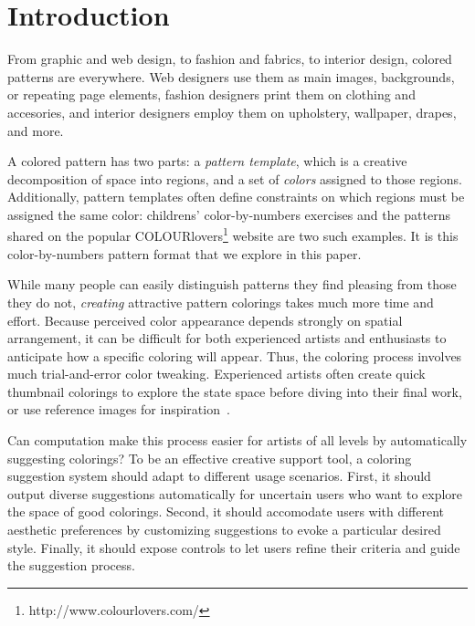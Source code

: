 \section{Introduction}
\label{sec:introduction}

From graphic and web design, to fashion and fabrics, to interior design, colored patterns are everywhere. Web designers use them as main images, backgrounds, or repeating page elements, fashion designers print them on clothing and accesories, and interior designers employ them on upholstery, wallpaper, drapes, and more.

A colored pattern has two parts: a \emph{pattern template}, which is a creative decomposition of space into regions, and a set of \emph{colors} assigned to those regions.
Additionally, pattern templates often define constraints on which regions must be assigned the same color: childrens' color-by-numbers exercises and the patterns shared on the popular COLOURlovers\footnote{http://www.colourlovers.com/} website are two such examples. It is this color-by-numbers pattern format that we explore in this paper.

While many people can easily distinguish patterns they find pleasing from those they do not, \emph{creating} attractive pattern colorings takes much more time and effort. Because perceived color appearance depends strongly on spatial arrangement, it can be difficult for both experienced artists and enthusiasts to anticipate how a specific coloring will appear. Thus, the coloring process involves much trial-and-error color tweaking. Experienced artists often create quick thumbnail colorings to explore the state space before diving into their final work, or use reference images for inspiration~\cite{ColorPaletteTools}.

Can computation make this process easier for artists of all levels by automatically suggesting colorings? To be an effective creative support tool, a coloring suggestion system should adapt to different usage scenarios. First, it should output diverse suggestions automatically for uncertain users who want to explore the space of good colorings. Second, it should accomodate users with different aesthetic preferences by customizing suggestions to evoke a particular desired style. Finally, it should expose controls to let users refine their criteria and guide the suggestion process. 

